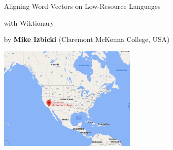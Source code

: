\documentclass{beamer}
\author {Mike Izbicki}
\institute{Claremont McKenna}
\title[Aligning Word Vectors with Wiktionary]{}
\date{16 Oct 2022}
\begin{document}
\beamertemplatenavigationsymbolsempty


\begin{frame}{}

\begin{center}
\Large

Aligning Word Vectors on Low-Resource Languages

with Wiktionary

\end{center}
\begin{center}
    by \textbf{Mike Izbicki} (Claremont McKenna College, USA)

    \vspace{0.2in}
    \includegraphics[height=2in]{img/cmc-map}

\end{center}


\end{frame}

\end{document}
